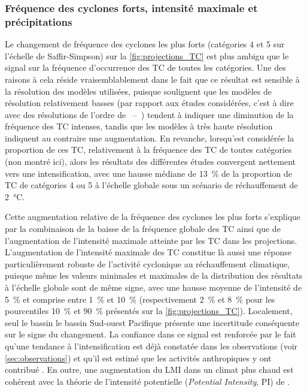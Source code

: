 \documentclass[../main.tex]{subfiles}
\begin{document}
\subsubsection*{Fréquence des cyclones forts, intensité maximale et précipitations}

Le changement de fréquence des cyclones les plus forts (catégories 4 et 5 sur l'échelle de Saffir-Simpson) sur la \cref{fig:projections_TC} est plus ambigu que
le signal sur la fréquence d'occurrence des TC de toutes les catégories. Une des raisons  à cela réside vraisemblablement dans le fait que ce résultat est
sensible à la résolution des modèles utilisées, puisque \cite{knutson_tropical_2020} soulignent que les modèles de résolution relativement basses (par rapport
aux études considérées, c'est à dire avec des résolutions de l'ordre de ~--~) tendent à indiquer une diminution de la fréquence des TC intenses,
tandis que les modèles à très haute résolution indiquent au contraire une augmentation. En revanche, lorsqu'est considérée la proportion de ces TC, relativement
à la fréquence des TC de toutes catégories (non montré ici), alors les résultats des différentes études convergent nettement vers une intensification, avec une
hausse médiane de \SI{13}{\percent} de la proportion de TC de catégories 4 ou 5 à l'échelle globale sous un scénario de réchauffement de \SI{2}{\degreeCelsius}.

Cette augmentation relative de la fréquence des cyclones les plus forts s'explique par la combinaison de la baisse de la fréquence globale des TC ainsi que de
l'augmentation de l'intensité maximale atteinte par les TC dans les projections. L'augmentation de l'intensité maximale des TC constitue là aussi une réponse
particulièrement robuste de l'activité cyclonique au réchauffement climatique, puisque même les valeurs minimales et maximales de la distribution des résultats
à l'échelle globale sont de même signe, avec une hausse moyenne de l'intensité de \SI{5}{\percent} et comprise entre \SI{1}{\percent} et \SI{10}{\percent}
(respectivement \SI{2}{\percent} et \SI{8}{\percent} pour les pourcentiles \SI{10}{\percent} et \SI{90}{\percent} présentés sur la \cref{fig:projections_TC}).
Localement, seul le bassin le bassin Sud-ouest Pacifique présente une incertitude conséquente sur le signe du changement. La confiance dans ce signal est
renforcée par le fait qu'une tendance à l'intensification est déjà constatée dans les observations (voir \cref{sec:observations}) et qu'il est estimé que les
activités anthropiques y ont contribué \parencite{knutson_tropical_2019}. En outre, une augmentation du LMI dans un climat plus chaud est cohérent avec la
théorie de l'intensité potentielle (\textit{Potential Intensity}, PI) de \cite{emanuel_dependence_1987}.
\end{document}
